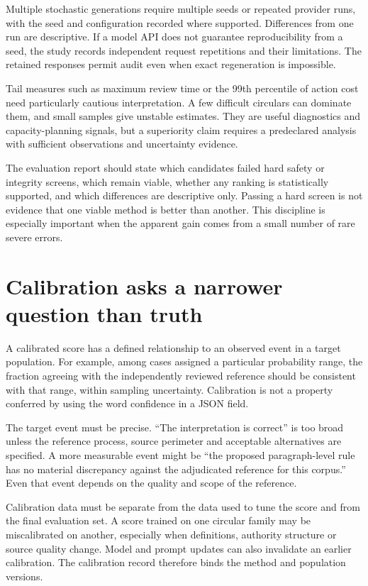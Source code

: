Multiple stochastic generations require multiple seeds or repeated provider runs,
with the seed and configuration recorded where supported. Differences from one
run are descriptive. If a model API does not guarantee reproducibility from a
seed, the study records independent request repetitions and their limitations.
The retained responses permit audit even when exact regeneration is impossible.

Tail measures such as maximum review time or the 99th percentile of action cost
need particularly cautious interpretation. A few difficult circulars can dominate
them, and small samples give unstable estimates. They are useful diagnostics and
capacity-planning signals, but a superiority claim requires a predeclared analysis
with sufficient observations and uncertainty evidence.

The evaluation report should state which candidates failed hard safety or
integrity screens, which remain viable, whether any ranking is statistically
supported, and which differences are descriptive only. Passing a hard screen is
not evidence that one viable method is better than another. This discipline is
especially important when the apparent gain comes from a small number of rare
severe errors.

\section{Calibration asks a narrower question than truth}
\label{merge:M09:08}


A calibrated score has a defined relationship to an observed event in a target
population. For example, among cases assigned a particular probability range,
the fraction agreeing with the independently reviewed reference should be
consistent with that range, within sampling uncertainty. Calibration is not a
property conferred by using the word confidence in a JSON field.

The target event must be precise. ``The interpretation is correct'' is too broad
unless the reference process, source perimeter and acceptable alternatives are
specified. A more measurable event might be ``the proposed paragraph-level rule
has no material discrepancy against the adjudicated reference for this corpus.''
Even that event depends on the quality and scope of the reference.

Calibration data must be separate from the data used to tune the score and from
the final evaluation set. A score trained on one circular family may be
miscalibrated on another, especially when definitions, authority structure or
source quality change. Model and prompt updates can also invalidate an earlier
calibration. The calibration record therefore binds the method and population
versions.

